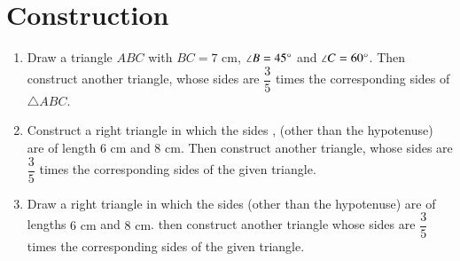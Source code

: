 \documentclass[journal,12pt,onecolumn]{IEEEtran}
\theoremstyle{remark}
\begin{document}
\section{Construction}
\begin{enumerate}
\item Draw a triangle $ABC$ with $BC = 7 \text{ cm}$, $\angle B = 45 \degree$ and $\angle C = 60 \degree$. Then construct another triangle, whose sides are $\dfrac{3}{5}$ times the corresponding sides of $\triangle ABC$. 
\item Construct a right triangle in which the sides , (other than the hypotenuse) are of length $6\text{ cm}$ and $8\text{ cm}$. Then construct another triangle, whose sides are $\dfrac{3}{5}$ times the corresponding sides of the given triangle. 
\item Draw a right triangle in which the sides (other than the hypotenuse) are of lengths $6\text{ cm}$ and $8\text{ cm}$. then construct another triangle whose sides are $\dfrac{3}{5}$ times the corresponding sides of the given triangle. 
\end{enumerate}
\end{document}
